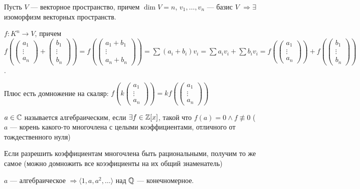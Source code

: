 \begin{remark}[Напоминание]
    Пусть $V$ --- векторное пространство, причем  $\dim V = n$,  $v_1, \ldots, v_n$ --- базис $V$  $\Rightarrow \exists$ изоморфизм векторных пространств.

    $f\!: K^n \to V$, причем  $f(\begin{pmatrix} a_1 \\ \vdots \\ a_n \end{pmatrix} + \begin{pmatrix} b_1 \\ \vdots \\ b_n \end{pmatrix}) = f(\begin{pmatrix} a_1 + b_1 \\ \vdots \\ a_n + b_n \end{pmatrix}) = \sum (a_i + b_i) v_i = \sum a_iv_i + \sum b_iv_i = f(\begin{pmatrix} a_1 \\ \vdots \\ a_n \end{pmatrix}) + f(\begin{pmatrix} b_1 \\ \vdots \\ b_n \end{pmatrix})$.

    Плюс есть домножение на скаляр: $f(k\begin{pmatrix} a_1 \\ \vdots \\ a_n \end{pmatrix}) = kf(\begin{pmatrix} a_1 \\ \vdots \\ a_n \end{pmatrix})$
\end{remark}
\begin{definition}
    $a \in \mathbb{C}$ называется алгебраическим, если $\exists f \in \mathbb{Z}[x]$, такой что  $f(a) = 0 \land f \not\equiv 0$ ($a$ --- корень какого-то многочлена с целыми коэффициентами, отличного от тождественного нуля)
\end{definition}
\begin{remark}
 Если разрешить коэффициентам многочлена быть рациональными, получим то же самое (можно домножить все коээфициенты на их общий знаменатель)
\end{remark}
 \begin{statement}
     $a$ --- алгебраическое  $\Rightarrow \langle 1, a, a^2, \ldots \rangle$ над $\mathbb{Q}$ --- конечномерное. 
\end{statement}
